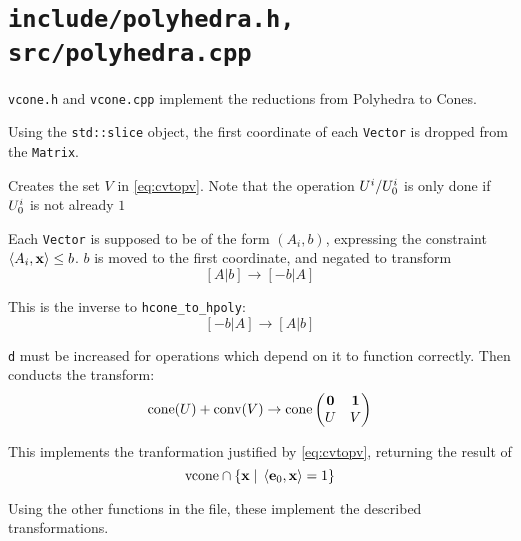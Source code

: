 \section{\texttt{include/polyhedra.h, src/polyhedra.cpp}}

\texttt{vcone.h} and \texttt{vcone.cpp} implement the reductions from Polyhedra to Cones.

\lstProjectZero
Using the \lstinline{std::slice} object, the first coordinate of each \lstinline{Vector} is dropped from the \lstinline{Matrix}.

\lstNormalizeP
Creates the set $V$ in \eqref{eq:cvtopv}.  Note that the operation $U^i/U^i_{0}$ is only done if $U^i_{0}$ is not already $1$

\lstHpolyToHCone
Each \lstinline{Vector} is supposed to be of the form $(A_i,b)$, expressing the constraint $\left\langle A_i, \mathbf{x} \right\rangle \leq b$.  $b$ is moved to the first coordinate, and negated to transform 
\[ [A|b] \to [-b|A] \]

\lstHconeToHPoly
This is the inverse to \lstinline{hcone_to_hpoly}:
\[ [-b|A] \to [A|b] \]

\lstVpolyToVCone
\lstinline{d} must be increased for operations which depend on it to function correctly.  Then conducts the transform:
\[ \cone(U) + \conv(V) \to \cone\lcone \]

\lstVconeToVPoly
This implements the tranformation justified by \eqref{eq:cvtopv}, returning the result of 
\[ \text{\lstinline{vcone}} \cap \set{\x \st \ip{\e_0}{\x} = 1} \]

\lstHpolyToVPoly
\lstVpolyToHPoly
Using the other functions in the file, these implement the described transformations.

